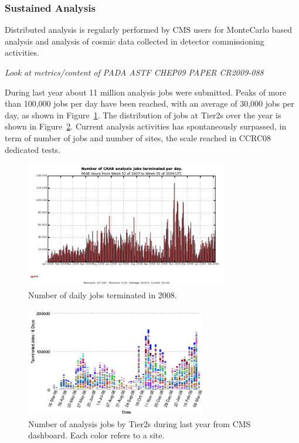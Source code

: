 \subsubsection{Sustained Analysis}
\label{sec:4_3_2}

Distributed analysis is regularly performed by CMS users for MonteCarlo based analysis
and analysis of cosmic data collected in detector commissioning activities.


\emph{Look at metrics/content of PADA ASTF CHEP09 PAPER CR2009-088}

During last year about 11 million analysis jobs were submitted.  Peaks
of more than 100,000 jobs per day have been reached, with an average
of 30,000 jobs per day, as shown in Figure~\ref{fig:jobs}.
The distribution of jobs at Tier2s over the year is shown in Figure~\ref{fig:AnalysisJobHistoryMarch0809}. Current analysis activities has spontaneously surpassed, in term of number of jobs and number of sites, the scale reached in CCRC08 dedicated tests. 

\begin{figure}
\includegraphics[width=3.5in]{figures/crabjobsdaily.png}
\caption{Number of daily jobs terminated in 2008. }
\label{fig:jobs}
\end{figure}
\begin{figure}
\includegraphics[width=0.7\textwidth]{figures/AnalysisJobHistoryMarch0809.png}
\caption{Number of analysis jobs by Tier2s during last year from CMS dashboard. Each color refers to a site. }
\label{fig:AnalysisJobHistoryMarch0809}
\end{figure}

